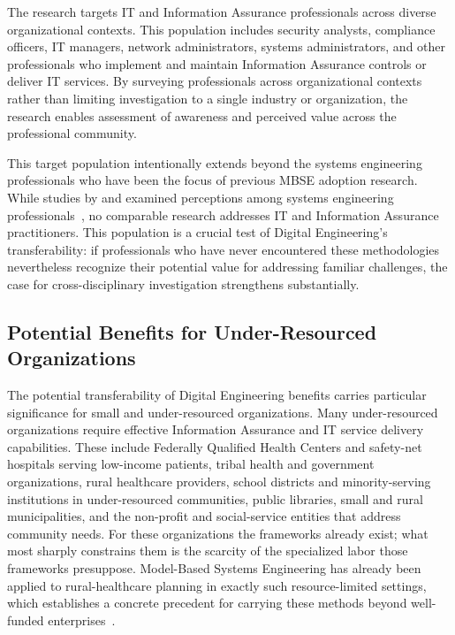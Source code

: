 The research targets IT and Information Assurance professionals across diverse organizational contexts. This population includes security analysts, compliance officers, IT managers, network administrators, systems administrators, and other professionals who implement and maintain Information Assurance controls or deliver IT services. By surveying professionals across organizational contexts rather than limiting investigation to a single industry or organization, the research enables assessment of awareness and perceived value across the professional community.

This target population intentionally extends beyond the systems engineering professionals who have been the focus of previous MBSE adoption research. While studies by \citeauthor{Call_2024} and \citeauthor{Henderson_McDermott_Salado_2024} examined perceptions among systems engineering professionals~\parencite{Call_2024, Henderson_McDermott_Salado_2024}, no comparable research addresses IT and Information Assurance practitioners. This population is a crucial test of Digital Engineering's transferability: if professionals who have never encountered these methodologies nevertheless recognize their potential value for addressing familiar challenges, the case for cross-disciplinary investigation strengthens substantially.

\subsection{Potential Benefits for Under-Resourced Organizations}

The potential transferability of Digital Engineering benefits carries particular significance for small and under-resourced organizations. Many under-resourced organizations require effective Information Assurance and IT service delivery capabilities. These include Federally Qualified Health Centers and safety-net hospitals serving low-income patients, tribal health and government organizations, rural healthcare providers, school districts and minority-serving institutions in under-resourced communities, public libraries, small and rural municipalities, and the non-profit and social-service entities that address community needs. For these organizations the frameworks already exist; what most sharply constrains them is the scarcity of the specialized labor those frameworks presuppose. Model-Based Systems Engineering has already been applied to rural-healthcare planning in exactly such resource-limited settings, which establishes a concrete precedent for carrying these methods beyond well-funded enterprises~\parencite{Berg_2023}.

